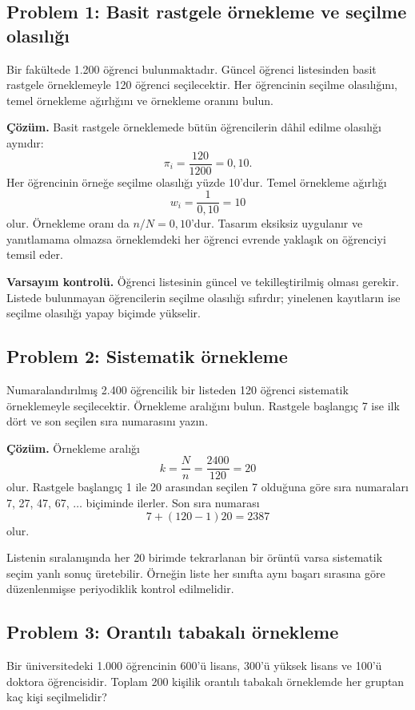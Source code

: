 \subsection*{Problem 1: Basit rastgele örnekleme ve seçilme olasılığı}

Bir fakültede 1.200 öğrenci bulunmaktadır. Güncel öğrenci listesinden basit
rastgele örneklemeyle 120 öğrenci seçilecektir. Her öğrencinin seçilme
olasılığını, temel örnekleme ağırlığını ve örnekleme oranını bulun.

\textbf{Çözüm.} Basit rastgele örneklemede bütün öğrencilerin dâhil edilme
olasılığı aynıdır:
\[
\pi_i=\frac{120}{1200}=0{,}10.
\]
Her öğrencinin örneğe seçilme olasılığı yüzde 10'dur. Temel örnekleme ağırlığı
\[
w_i=\frac{1}{0{,}10}=10
\]
olur. Örnekleme oranı da $n/N=0{,}10$'dur. Tasarım eksiksiz uygulanır ve
yanıtlamama olmazsa örneklemdeki her öğrenci evrende yaklaşık on öğrenciyi
temsil eder.

\textbf{Varsayım kontrolü.} Öğrenci listesinin güncel ve tekilleştirilmiş
olması gerekir. Listede bulunmayan öğrencilerin seçilme olasılığı sıfırdır;
yinelenen kayıtların ise seçilme olasılığı yapay biçimde yükselir.

\subsection*{Problem 2: Sistematik örnekleme}

Numaralandırılmış 2.400 öğrencilik bir listeden 120 öğrenci sistematik
örneklemeyle seçilecektir. Örnekleme aralığını bulun. Rastgele başlangıç 7 ise
ilk dört ve son seçilen sıra numarasını yazın.

\textbf{Çözüm.} Örnekleme aralığı
\[
k=\frac{N}{n}=\frac{2400}{120}=20
\]
olur. Rastgele başlangıç 1 ile 20 arasından seçilen 7 olduğuna göre sıra
numaraları 7, 27, 47, 67, $\ldots$ biçiminde ilerler. Son sıra numarası
\[
7+(120-1)20=2387
\]
olur.

Listenin sıralanışında her 20 birimde tekrarlanan bir örüntü varsa sistematik
seçim yanlı sonuç üretebilir. Örneğin liste her sınıfta aynı başarı sırasına
göre düzenlenmişse periyodiklik kontrol edilmelidir.

\subsection*{Problem 3: Orantılı tabakalı örnekleme}

Bir üniversitedeki 1.000 öğrencinin 600'ü lisans, 300'ü yüksek lisans ve
100'ü doktora öğrencisidir. Toplam 200 kişilik orantılı tabakalı örneklemde
her gruptan kaç kişi seçilmelidir?

